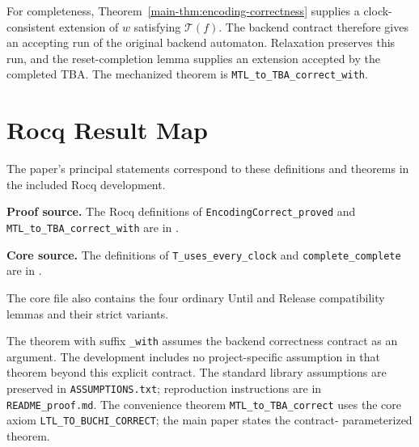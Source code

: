 \documentclass[10pt,journal,compsoc]{IEEEtran}
\newcommand{\T}{\mathcal{T}}
\begin{document}
For completeness, Theorem~\ref{main-thm:encoding-correctness} supplies a
clock-consistent extension of $w$ satisfying $\T(f)$. The backend contract
therefore gives an accepting run of the original backend automaton.
Relaxation preserves this run, and the reset-completion lemma supplies an
extension accepted by the completed TBA. The mechanized theorem is
\texttt{MTL\_to\_TBA\_correct\_with}.



\section{Rocq Result Map}
\label{app:rocq}
The paper's principal statements correspond to these definitions and
theorems in the included Rocq development.\par\smallskip
\noindent\textbf{Proof source.} The Rocq definitions of
\texttt{EncodingCorrect\_proved} and
\texttt{MTL\_to\_TBA\_correct\_with} are in
.\par\smallskip
\noindent\textbf{Core source.} The definitions of
\texttt{T\_uses\_every\_clock} and \texttt{complete\_complete} are in
.\par\smallskip
The core file also contains the four ordinary Until and Release compatibility
lemmas and their strict variants.\par\smallskip
The theorem with suffix \texttt{\_with} assumes the backend correctness
contract as an argument. The development includes no project-specific
assumption in that theorem beyond this explicit contract. The standard
library assumptions are preserved in \texttt{ASSUMPTIONS.txt}; reproduction
instructions are in \texttt{README\_proof.md}. The convenience theorem
\texttt{MTL\_to\_TBA\_correct} uses the core axiom
\texttt{LTL\_TO\_BUCHI\_CORRECT}; the main paper states the contract-
parameterized theorem.
\end{document}
